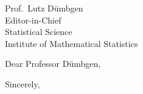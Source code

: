 \documentclass[11pt,a4paper]{letter}
\begin{document}
\begin{letter}{Prof.\ Lutz Dümbgen \\ Editor-in-Chief \\ Statistical Science \\ Institute of Mathematical Statistics}

\opening{Dear Professor Dümbgen,}


\closing{Sincerely,}

\end{letter}
\end{document}

